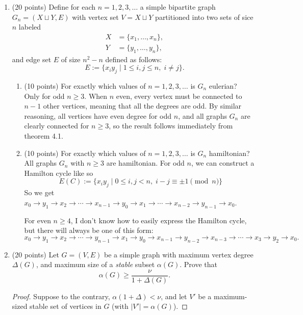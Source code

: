 \documentclass[11pt]{article}
\newcommand{\n}{\vspace{0.2cm}}
\begin{document}
\begin{enumerate}
    \item (20 points) Define for each \(n=1,2,3,\hdots\) a simple bipartite graph \(G_n = (X \sqcup Y, E)\) with vertex set \(V = X \sqcup Y\) partitioned into two sets of sice \(n\) labeled
      \begin{align*}
        X &= \{x_1, \hdots, x_n\}, \\
        Y &= \{y_1, \hdots, y_n\},
      \end{align*}
      and edge set \(E\) of size \(n^2 - n\) defined as follows:
      \[E := \{x_iy_j \mid 1 \leq i,j \leq n, \; i \neq j\}.\]
      \begin{enumerate}
        \item (10 points) For exactly which values of \(n=1,2,3,\hdots\) is \(G_n\) eulerian? \n\\
          Only for odd \(n \geq 3\).  When \(n\) even, every vertex must be connected to \(n-1\) other vertices, meaning that all the degrees are odd.  By similar reasoning, all vertices have even degree for odd \(n\), and all graphs \(G_n\) are clearly connected for \(n \geq 3\), so the result follows immediately from theorem 4.1. \n

        \item (10 points) For exactly which values of \(n=1,2,3,\hdots\) is \(G_n\) hamiltonian? \n\\
          All graphs \(G_n\) with \(n \geq 3\) are hamiltonian.  For odd \(n\), we can construct a Hamilton cycle like so 
          \[E(C) := \{x_iy_j \mid 0 \leq i,j < n, \; i-j \equiv \pm 1 \pmod n\}\]
          So we get \(x_0 \to y_1 \to x_2 \to \cdots \to x_{n-1} \to y_0 \to x_1 \to \cdots \to x_{n-2} \to y_{n-1} \to x_0\). \n

          For even \(n \geq 4\), I don't know how to easily express the Hamilton cycle, but there will always be one of this form:
          \[x_0 \to y_1 \to x_2 \to \cdots \to y_{n-1} \to x_1 \to y_0 \to x_{n-1} \to y_{n-2} \to x_{n-3} \to \cdots \to x_3 \to y_2 \to x_0.\]
      \end{enumerate}

    \item (20 points) Let \(G = (V,E)\) be a simple graph with maximum vertex degree \(\Delta(G)\), and maximum size of a \textit{stable} subset \(\alpha(G)\).  Prove that
      \[\alpha(G) \geq \frac{\nu}{1 + \Delta(G)}.\]
      \begin{proof}
        Suppose to the contrary, \(\alpha(1 + \Delta) < \nu\), and let \(V'\) be a maximum-sized stable set of vertices in \(G\) (with \(|V'| = \alpha(G)\)). \n


\end{proof}
\end{enumerate}
\end{document}
